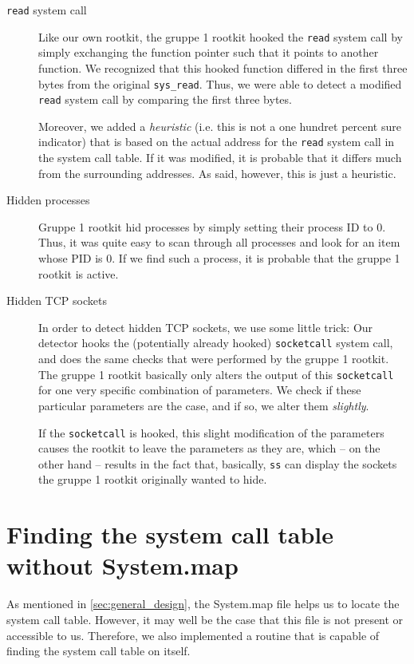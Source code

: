 \documentclass[10pt, letterpaper]{scrartcl}
\begin{document}
\begin{description}
\item[\texttt{read} system call] Like our own rootkit, the gruppe 1 rootkit hooked the \texttt{read} system call by simply exchanging the function pointer such that it points to another function. We recognized that this hooked function differed in the first three bytes from the original \texttt{sys\_read}. Thus, we were able to detect a modified \texttt{read} system call by comparing the first three bytes.

Moreover, we added a \emph{heuristic} (i.e. this is not a one hundret percent sure indicator) that is based on the actual address for the \texttt{read} system call in the system call table. If it was modified, it is probable that it differs much from the surrounding addresses. As said, however, this is just a heuristic.
\item[Hidden processes] Gruppe 1 rootkit hid processes by simply setting their process ID to 0. Thus, it was quite easy to scan through all processes and look for an item whose PID is 0. If we find such a process, it is probable that the gruppe 1 rootkit is active.
\item[Hidden TCP sockets] In order to detect hidden TCP sockets, we use some little trick: Our detector hooks the (potentially already hooked) \texttt{socketcall} system call, and does the same checks that were performed by the gruppe 1 rootkit. The gruppe 1 rootkit basically only alters the output of this \texttt{socketcall} for one very specific combination of parameters. We check if these particular parameters are the case, and if so, we alter them \emph{slightly}. 

If the \texttt{socketcall} is hooked, this slight modification of the parameters causes the rootkit to leave the parameters as they are, which -- on the other hand -- results in the fact that, basically, \texttt{ss} can display the sockets the gruppe 1 rootkit originally wanted to hide.
\end{description}

\section{Finding the system call table without System.map}
\label{sec:syscalltable-without-system-map}

As mentioned in \autoref{sec:general_design}, the System.map file helps us to locate the system call table. However, it may well be the case that this file is not present or accessible to us. Therefore, we also implemented a routine that is capable of finding the system call table on itself.
\end{document}
